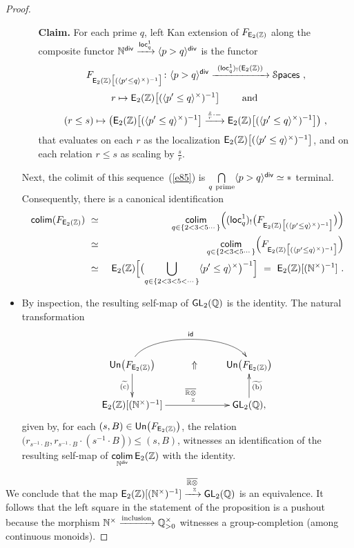 \begin{proof}
\begin{itemize}
\begin{itemize}
\item[{\bf Claim.}]
For each prime $q$, 
left Kan extension of $F_{\operatorname{\mathsf E_2(\mathbb Z)}}$ along the composite functor $\mathbb N^{\sf div}\xrightarrow{{\sf loc}_q^1} \langle p>q \rangle^{\sf div}$ is the functor
\[
F_{\operatorname{\mathsf E_2(\mathbb Z)}\bigl[ (\langle p' \leq q \rangle^{\times})^{-1}\bigr]}
\colon \langle p > q \rangle^{\sf div} 
\xrightarrow{~({\sf loc}_q^1)_!(\operatorname{\mathsf E_2(\mathbb Z)})~} 
\operatorname{\mathcal S\mathsf{paces}}
~,
\]
\[
r\mapsto \operatorname{\mathsf E_2(\mathbb Z)}\bigl[ (\langle p' \leq q \rangle^{\times})^{-1}\bigr]
\qquad
\text{ and }
\qquad
\]
\[
(r\leq s)
\mapsto 
\bigl(
\operatorname{\mathsf E_2(\mathbb Z)}\bigl[ (\langle p' \leq q \rangle^{\times})^{-1}\bigr] \xrightarrow{ \frac{s}{r} \cdot -} \operatorname{\mathsf E_2(\mathbb Z)}\bigl[ (\langle p' \leq q \rangle^{\times})^{-1}\bigr]
\bigr)
~,
\]
that evaluates on each $r$ as the localization $\operatorname{\mathsf E_2(\mathbb Z)}\bigl[ (\langle p' \leq q \rangle^{\times})^{-1} \bigr]$, and on each relation $r \leq s$ as scaling by $\frac{s}{r}$.
\end{itemize}
Next, the colimit of this sequence~(\ref{e85}) is $\underset{q ~ \rm prime}\bigcap \langle p > q \rangle^{\sf div} \simeq \ast$ terminal.  
Consequently, there is a canonical identification 
\begin{eqnarray}
\nonumber
\operatorname{{\sf colim}}( F_{\operatorname{\mathsf E_2(\mathbb Z)}} )
&
~\simeq ~
&
\underset{q \in \{2<3<5\cdots\}}{\operatorname{{\sf colim}}} 
\Bigl(
({\sf loc}^1_q)_! \bigl( F_{\operatorname{\mathsf E_2(\mathbb Z)}\bigl[ (\langle p' \leq q \rangle^{\times})^{-1}\bigr]} \bigr)
\Bigr)
\\
\nonumber
&
~\simeq~
&
\underset{q \in \{2<3<5\cdots\}}{\operatorname{{\sf colim}}} 
\Bigl(
F_{\operatorname{\mathsf E_2(\mathbb Z)}\bigl[ (\langle p' \leq q \rangle^{\times})^{-1}\bigr]}
\Bigr)
\\
\nonumber
&
~\simeq~
&
\operatorname{\mathsf E_2(\mathbb Z)}\Bigl[ 
\bigl(
\underset{q \in \{2<3<5<\cdots\}} \bigcup \langle p' \leq q \rangle^{\times} 
\bigr)^{-1}
\Bigr]
~=~
\operatorname{\mathsf E_2(\mathbb Z)}[ (\mathbb N^\times)^{-1} ]
~.
\end{eqnarray}



\item
By inspection, the resulting self-map of $\operatorname{\sf GL}_2(\mathbb Q)$ is the identity.  
The natural transformation
\[
\xymatrix{
{\sf Un}\bigl( F_{\EZ} \bigr)
\ar@(u,u)[rr]^-{\id}
\ar[d]_-{\w{\rm (c)}}
&
\Uparrow
&
{\sf Un}\bigl( F_{\EZ} \bigr)
\\
\EZ[(\NN^\times)^{-1}]
\ar[rr]^{\ov{\RR\underset{\ZZ}\ot}}
&&
\GL_2(\QQ)
\ar[u]_-{\w{\rm (b)}}
,
}
\]
given by, for each $(s,B)\in {\sf Un}\bigl( F_{\operatorname{\mathsf E_2(\mathbb Z)}} \bigr)$, the relation $\bigl( r_{s^{-1}\cdot B} , r_{s^{-1}\cdot B} \cdot (s^{-1}\cdot B) \bigr)  \leq (s,B)$, witnesses an identification of the resulting self-map of $\underset{\mathbb N^{\sf div}}{\operatorname{{\sf colim}}} \operatorname{\mathsf E_2(\mathbb Z)}$ with the identity.  
\end{itemize}
We conclude that the map $\operatorname{\mathsf E_2(\mathbb Z)}[(\mathbb N^\times)^{-1}]\xrightarrow{\overline{\mathbb R\underset{\mathbb Z}{\otimes}}} \operatorname{\sf GL}_2(\mathbb Q)$ is an equivalence.
It follows that the left square in the statement of the proposition is a pushout because the morphism $\mathbb N^\times \xrightarrow{\rm inclusion}\mathbb Q_{>0}^{\times}$ witnesses a group-completion (among continuous monoids).


\end{proof}
